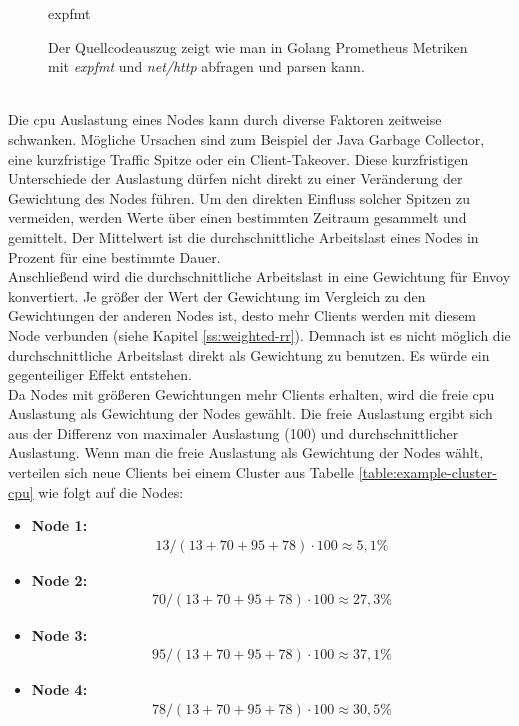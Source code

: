 \begin{figure}
    {expfmt}
    \caption{Der Quellcodeauszug zeigt wie man in Golang Prometheus Metriken mit \textit{expfmt} und \textit{net/http} abfragen und parsen kann.}
    \label{code:expfmt}
\end{figure}
\\
Die \ac{cpu} Auslastung eines Nodes kann durch diverse Faktoren zeitweise schwanken. Mögliche Ursachen sind zum Beispiel der Java Garbage Collector, eine kurzfristige Traffic Spitze oder ein Client-Takeover.
Diese kurzfristigen Unterschiede der Auslastung dürfen nicht direkt zu einer Veränderung der Gewichtung des Nodes führen.
Um den direkten Einfluss solcher Spitzen zu vermeiden, werden Werte über einen bestimmten Zeitraum gesammelt und gemittelt. Der Mittelwert ist die durchschnittliche Arbeitslast eines Nodes in Prozent für eine bestimmte Dauer.
\\
Anschlie{\ss}end wird die durchschnittliche Arbeitslast in eine Gewichtung für Envoy konvertiert.
Je grö{\ss}er der Wert der Gewichtung im Vergleich zu den Gewichtungen der anderen Nodes ist, desto mehr Clients werden mit diesem Node verbunden (siehe Kapitel \ref{ss:weighted-rr}).
Demnach ist es nicht möglich die durchschnittliche Arbeitslast direkt als Gewichtung zu benutzen. Es würde ein gegenteiliger Effekt entstehen.
\\
Da Nodes mit grö{\ss}eren Gewichtungen mehr Clients erhalten, wird die freie \ac{cpu} Auslastung als Gewichtung der Nodes gewählt.
Die freie Auslastung ergibt sich aus der Differenz von maximaler Auslastung (100) und durchschnittlicher Auslastung.
Wenn man die freie Auslastung als Gewichtung der Nodes wählt, verteilen sich neue Clients bei einem Cluster aus Tabelle \ref{table:example-cluster-cpu} wie folgt auf die Nodes:
\begin{itemize}
  \item \textbf{Node 1:}
    \begin{align}
      13 / (13 + 70 + 95 + 78) \cdot 100 \approx 5,1 \%
    \end{align}
  \item \textbf{Node 2:}
    \begin{align}
      70 / (13 + 70 + 95 + 78) \cdot 100 \approx 27,3 \%
    \end{align}
  \item \textbf{Node 3:}
    \begin{align}
      95 / (13 + 70 + 95 + 78) \cdot 100 \approx 37,1 \%
    \end{align}
  \item \textbf{Node 4:}
    \begin{align}
      78 / (13 + 70 + 95 + 78) \cdot 100 \approx 30,5 \%
    \end{align}
\end{itemize}
